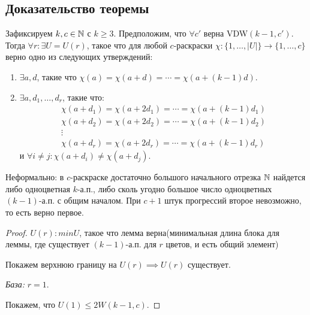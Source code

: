 \begin{normalsize}

\subsection{Доказательство теоремы}

\begin{lemma}
    Зафиксируем $k, c \in \mathbb{N}$ с $k \geq 3$. Предположим, что $\forall c'$ верна VDW$(k-1, c')$. Тогда $\forall r: \exists U = U(r)$, такое что для любой $c$-раскраски $\chi: \{1, \ldots, |U|\} \to \{1, \ldots, c\}$ верно одно из следующих утверждений:

    \begin{enumerate}
        \item $\exists a, d$, такие что $\chi(a) = \chi(a + d) = \cdots = \chi(a + (k - 1)d)$.
        
        \item $\exists a, d_1, \ldots, d_r$, такие что:
        \begin{gather*}
            \chi(a + d_1) = \chi(a + 2d_1) = \cdots = \chi(a + (k - 1)d_1)\\
            \chi(a + d_2) = \chi(a + 2d_2) = \cdots = \chi(a + (k - 1)d_2)\\
            \vdots\\
            \chi(a + d_r) = \chi(a + 2d_r) = \cdots = \chi(a + (k - 1)d_r)
        \end{gather*}
        и $\forall i \neq j: \chi(a + d_i) \neq \chi(a + d_j)$.
    \end{enumerate}

    Неформально: в $c$-раскраске достаточно большого начального отрезка $\mathbb{N}$ найдется либо одноцветная $k$-а.п., либо сколь угодно большое число одноцветных $(k - 1)$-а.п. с общим началом. При $c + 1$ штук прогрессий второе невозможно, то есть верно первое.

\end{lemma}

\begin{proof}

    $U(r): min U$, такое что лемма верна(минимальная длина блока для леммы, где существует $(k - 1)$-а.п. для $r$ цветов, и есть общий элемент)

    Покажем верхнюю границу на $U(r) \implies U(r)$ существует.
    
    \textsl{База:} $r = 1$. 

    Покажем, что $U(1) \leq 2W(k - 1, c)$.


\end{proof}
\end{normalsize}
